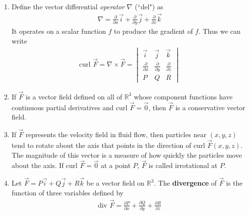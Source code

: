 \documentclass[10pt]{article}
\begin{document}
\begin{multicols}{2}
\begin{enumerate}
\begin{enumerate}
        \item Define the vector differential \textit{operator} $\nabla$ (``del") as
        \vspace{-3mm}
        \begin{align*}
            \nabla = 
            \frac{\partial}{\partial x}\vec{i} + \frac{\partial}{\partial y}\vec{j} + \frac{\partial}{\partial z}\vec{k} 
        \end{align*}
        It operates on a scalar function $f$ to produce the gradient of $f$. Thus we can write
        \begin{align*}
            \text{curl }\vec{F} = 
            \nabla \times \vec{F} =
            \begin{vmatrix}
            \vec{i} & \vec{j} & \vec{k} \\[3 pt]
            \frac{\partial}{\partial x} & \frac{\partial}{\partial y} & \frac{\partial}{\partial z} \\[5 pt]
            P & Q & R
            \end{vmatrix}
        \end{align*}
        \item If $\vec{F}$ is a vector field defined on all of $\mathbb{R}^3$ whose component functions have continuous partial derivatives and $\text{curl }\vec{F}=\vec{0}$, then $\vec{F}$ is a conservative vector field.
        \item If $\vec{F}$ represents the velocity field in fluid flow, then particles near $(x,y,z)$ tend to rotate about the axis that points in the direction of $\text{curl }\vec{F}(x,y,z)$. The magnitude of this vector is a measure of how quickly the particles move about the axis. If $\text{curl }\vec{F}=\vec{0}$ at a point $P$, $\vec{F}$ is called irrotational at $P$.
        \item Let $\vec{F} = P\vec{i} + Q\vec{j} + R\vec{k}$ be a vector field on $\mathbb{R}^3$. The \textbf{divergence} of $\vec{F}$ is the function of three variables defined by
        \begin{align*}
            \text{div }\vec{F} = \frac{\partial P}{\partial x} + \frac{\partial Q}{\partial y} + \frac{\partial R}{\partial z} 

\end{align*}
\end{enumerate}
\end{enumerate}
\end{multicols}
\end{document}

